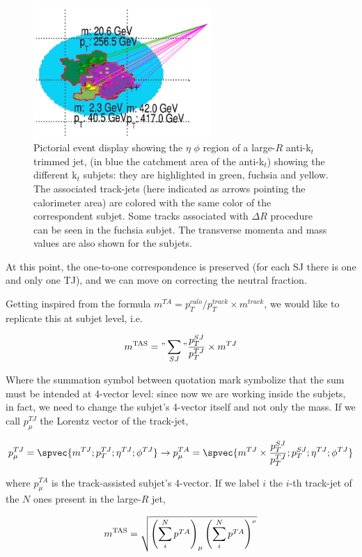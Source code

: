 \begin{figure}[!ht]
  \centering
      \includegraphics[width=0.6\textwidth]{jet_part/mtas/mtas.png}
  \caption[Pictorial event display]{Pictorial event display showing the $\eta$ $\phi$ region of a large-$R$ anti-k$_t$ trimmed jet, (in blue the catchment area of the anti-k$_t$) showing the different k$_t$ subjets: they are highlighted in green, fuchsia and yellow. The associated track-jets (here indicated as arrows pointing the calorimeter area) are colored with the same color of the correspondent subjet. Some tracks associated with $\Delta R$ procedure can be seen in the fuchsia subjet. The transverse momenta and mass values are also shown for the subjets.}
  \label{fig:mtas1}
\end{figure}

At this point, the one-to-one correspondence is preserved (for each SJ there is one and only one TJ), and we can move on correcting the neutral fraction.

Getting inspired from the formula $m^{TA}=p_T^{calo}/p_T^{track}\times m^{track}$, we would like to replicate this at subjet level, i.e.

$$m^\textrm{TAS}="\sum_{SJ}"\frac{p_T^{SJ}}{p_T^{TJ}}\times m^{TJ}$$

Where the summation symbol between quotation mark symbolize that the sum must be intended at 4-vector level: since now we are working inside the subjets, in fact, we need to change the subjet's 4-vector itself and not only the mass. If we call $p_\mu^{TJ}$ the Lorentz vector of the track-jet, 

$$p_\mu^{TJ} = \spvec{m^{TJ};p_T^{TJ};\eta^{TJ};\phi^{TJ}} \to p_\mu^{TA}=\spvec{m^{TJ}\times\frac{p_T^{SJ}}{p_T^{TJ}} ;p_T^{SJ};\eta^{TJ};\phi^{TJ}} $$
 
where $p_\mu^{TA}$ is the track-assisted subjet's 4-vector. If we label $i$ the $i$-th track-jet of the $N$ ones present in the large-$R$ jet,

$$ m^\textrm{TAS}=\sqrt{\left(\sum_i^N p^{TA} \right)_\mu \left(\sum_i^N p^{TA} \right)^{_\mu}} $$

